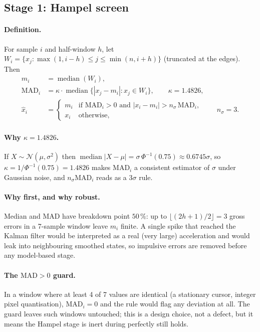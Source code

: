 \documentclass[11pt,a4paper]{article}
\begin{document}
\subsection{Stage 1: Hampel screen}
\label{sec:hampel}

\paragraph{Definition.} For sample $i$ and half-window $h$, let
$W_i = \{x_j : \max(1, i-h) \le j \le \min(n, i+h)\}$ (truncated at the edges).
Then
\begin{align}
  m_i &= \operatorname{median}(W_i), \label{eq:hampel-m}\\
  \mathrm{MAD}_i &= \kappa \cdot \operatorname{median}\big\{|x_j - m_i| : x_j \in W_i\big\},
    \qquad \kappa = 1.4826, \label{eq:hampel-mad}\\
  \hat x_i &=
  \begin{cases}
    m_i & \text{if } \mathrm{MAD}_i > 0 \text{ and } |x_i - m_i| > n_\sigma\,\mathrm{MAD}_i,\\
    x_i & \text{otherwise,}
  \end{cases}
  \qquad n_\sigma = 3. \label{eq:hampel}
\end{align}

\paragraph{Why $\kappa = 1.4826$.} If $X \sim \mathcal{N}(\mu, \sigma^2)$ then
$\operatorname{median}|X - \mu| = \sigma\,\Phi^{-1}(0.75) \approx 0.6745\sigma$,
so $\kappa = 1/\Phi^{-1}(0.75) = 1.4826$ makes $\mathrm{MAD}_i$ a consistent
estimator of $\sigma$ under Gaussian noise, and $n_\sigma \mathrm{MAD}_i$ reads
as a $3\sigma$ rule.

\paragraph{Why first, and why robust.} Median and MAD have breakdown point
$50\,\%$: up to $\lfloor (2h+1)/2 \rfloor = 3$ gross errors in a 7-sample window
leave $m_i$ finite. A single spike that reached the Kalman filter would be
interpreted as a real (very large) acceleration and would leak into neighbouring
smoothed states, so impulsive errors are removed before any model-based stage.

\paragraph{The $\mathrm{MAD} > 0$ guard.} In a window where at least 4 of 7
values are identical (a stationary cursor, integer pixel quantisation),
$\mathrm{MAD}_i = 0$ and the rule would flag any deviation at all. The guard
leaves such windows untouched; this is a design choice, not a defect, but it
means the Hampel stage is inert during perfectly still holds.
\end{document}
